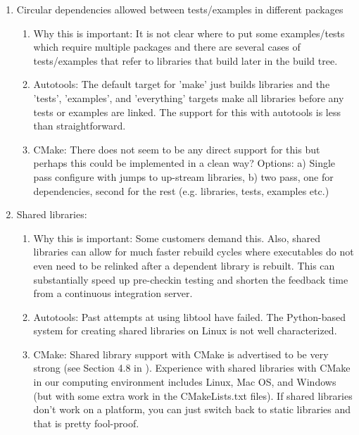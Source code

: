\documentclass[pdf,ps2pdf,11pt]{SANDreport}
\begin{document}
\begin{enumerate}

{}\item Circular dependencies allowed between tests/examples in
different packages

  \begin{enumerate}

  {}\item Why this is important: It is not clear where to put some
  examples/tests which require multiple packages and there are
  several cases of tests/examples that refer to libraries that build
  later in the build tree.

  {}\item Autotools: The default target for 'make' just builds
  libraries and the 'tests', 'examples', and 'everything' targets
  make all libraries before any tests or examples are linked.  The
  support for this with autotools is less than straightforward.

  {}\item CMake: There does not seem to be any direct support for
  this but perhaps this could be implemented in a clean way? 
  Options: a) Single pass configure with jumps to up-stream
  libraries, b) two pass, one for dependencies, second for the rest
  (e.g. libraries, tests, examples etc.)

  \end{enumerate}

{}\item Shared libraries:

  \begin{enumerate}

  {}\item Why this is important: Some customers demand this.  Also,
  shared libraries can allow for much faster rebuild cycles where
  executables do not even need to be relinked after a dependent
  library is rebuilt.  This can substantially speed up pre-checkin
  testing and shorten the feedback time from a continuous
  integration server.

  {}\item Autotools: Past attempts at using libtool have failed.
  The Python-based system for creating shared libraries on Linux is
  not well characterized.

  {}\item CMake: Shared library support with CMake is advertised to
  be very strong (see Section 4.8 in
  {}\cite{MasteringCMake_fourth}).  Experience with shared libraries
  with CMake in our computing environment includes Linux, Mac OS,
  and Windows (but with some extra work in the CMakeLists.txt
  files).  If shared libraries don't work on a platform, you can
  just switch back to static libraries and that is pretty
  fool-proof.


\end{enumerate}
\end{enumerate}
\end{document}
